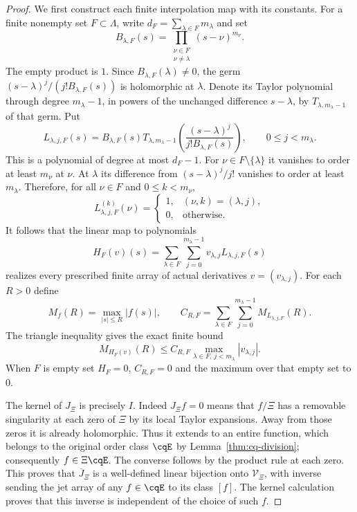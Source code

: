 \begin{proof}
We first construct each finite interpolation map with its constants.
For a finite nonempty set $F\subset\Lambda$, write
$d_F=\sum_{\lambda\in F}m_\lambda$ and set
\[
 B_{\lambda,F}(s)=
 \prod_{\substack{\nu\in F\\\nu\ne\lambda}}
 (s-\nu)^{m_\nu}.
\]
The empty product is $1$. Since
$B_{\lambda,F}(\lambda)\ne0$, the germ
$(s-\lambda)^j/(j!B_{\lambda,F}(s))$ is holomorphic at
$\lambda$. Denote its Taylor polynomial through degree
$m_\lambda-1$, in powers of the unchanged difference
$s-\lambda$, by $T_{\lambda,m_\lambda-1}$ of that germ. Put
\begin{equation}\label{eq:cq-Hermite-basis-unscaled}
 L_{\lambda,j,F}(s)=B_{\lambda,F}(s)
 T_{\lambda,m_\lambda-1}
 \left(\frac{(s-\lambda)^j}{j!B_{\lambda,F}(s)}\right),
 \qquad 0\leq j<m_\lambda.
\end{equation}
This is a polynomial of degree at most $d_F-1$.
For $\nu\in F\setminus\{\lambda\}$ it vanishes to order
at least $m_\nu$ at $\nu$. At $\lambda$ its difference from
$(s-\lambda)^j/j!$ vanishes to order at least $m_\lambda$.
Therefore, for all $\nu\in F$ and $0\leq k<m_\nu$,
\[
 L_{\lambda,j,F}^{(k)}(\nu)
   =\begin{cases}1,&(\nu,k)=(\lambda,j),\\0,&\text{otherwise}.
     \end{cases}
\]
It follows that the linear map to polynomials
\begin{equation}\label{eq:cq-finite-Hermite-lift}
 H_F(v)(s)=\sum_{\lambda\in F}\sum_{j=0}^{m_\lambda-1}
              v_{\lambda,j}L_{\lambda,j,F}(s)
\end{equation}
realizes every prescribed finite array of actual derivatives
$v=(v_{\lambda,j})$. For each $R>0$ define
\[
 M_f(R)=\max_{|s|\leq R}|f(s)|,\qquad
 C_{R,F}=\sum_{\lambda\in F}\sum_{j=0}^{m_\lambda-1}
                  M_{L_{\lambda,j,F}}(R).
\]
The triangle inequality gives the exact finite bound
\begin{equation}\label{eq:cq-Hermite-lift-bound}
 M_{H_F(v)}(R)\leq C_{R,F}
             \max_{\lambda\in F,\,j<m_\lambda}|v_{\lambda,j}|.
\end{equation}
When $F$ is empty set $H_F=0$, $C_{R,F}=0$ and the maximum
over that empty set to $0$.

The kernel of $J_\Xi$ is precisely $I$. Indeed $J_\Xi f=0$
means that $f/\Xi$ has a removable singularity at each zero of
$\Xi$ by its local Taylor expansions. Away from those zeros it
is already holomorphic. Thus it extends to an entire function,
which belongs to the original order class $\cqE$ by
Lemma~\ref{thm:cq-division}; consequently $f\in\Xi\cqE$.
The converse follows by the product rule at each zero. This proves
that $\overline J_\Xi$ is a well-defined linear bijection onto
$\mathcal V_\Xi$, with inverse sending the jet array of any
$f\in\cqE$ to its class $[f]$. The kernel calculation proves
that this inverse is independent of the choice of such $f$.


\end{proof}
